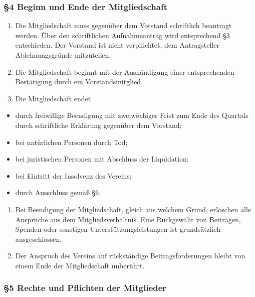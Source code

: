 \documentclass[german]{article}
\providecommand{\tightlist}{%
	\setlength{\itemsep}{0pt}\setlength{\parskip}{0pt}}
\begin{document}
\subsubsection*{§4 Beginn und Ende der
Mitgliedschaft}\label{beginn-und-ende-der-mitgliedschaft}

\begin{enumerate}
\def\labelenumi{\arabic{enumi}.}
\item
  Die Mitgliedschaft muss gegenüber dem Vorstand schriftlich beantragt
  werden. Über den schriftlichen Aufnahmeantrag wird entsprechend §3
  entschieden. Der Vorstand ist nicht verpflichtet, dem Antragsteller
  Ablehnungsgründe mitzuteilen.
\item
  Die Mitgliedschaft beginnt mit der Aushändigung einer entsprechenden
  Bestätigung durch ein Vorstandsmitglied.
\item
  Die Mitgliedschaft endet
\end{enumerate}

\begin{itemize}
\tightlist
\item
  durch freiwillige Beendigung mit zweiwöchiger Frist zum Ende des
  Quartals durch schriftliche Erklärung gegenüber dem Vorstand;
\item
  bei natürlichen Personen durch Tod;
\item
  bei juristischen Personen mit Abschluss der Liquidation;
\item
  bei Eintritt der Insolvenz des Vereins;
\item
  durch Ausschluss gemäß §6.
\end{itemize}

\begin{enumerate}
\def\labelenumi{\arabic{enumi}.}
\setcounter{enumi}{3}
\item
  Bei Beendigung der Mitgliedschaft, gleich aus welchem Grund, erlöschen
  alle Ansprüche aus dem Mitgliedsverhältnis. Eine Rückgewähr von
  Beiträgen, Spenden oder sonstigen Unterstützungsleistungen ist
  grundsätzlich ausgeschlossen.
\item
  Der Anspruch des Vereins auf rückständige Beitragsforderungen bleibt
  von einem Ende der Mitgliedschaft unberührt.
\end{enumerate}

\subsubsection*{§5 Rechte und Pflichten der
Mitglieder}\label{rechte-und-pflichten-der-mitglieder}
\end{document}
